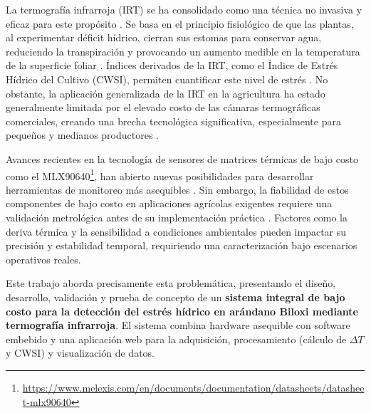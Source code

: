 \documentclass[12pt,openright,oneside]{book}
\begin{document}
La termografía infrarroja (IRT) se ha consolidado como una técnica no invasiva y eficaz para este propósito . Se basa en el principio fisiológico de que las plantas, al experimentar déficit hídrico, cierran sus estomas para conservar agua, reduciendo la transpiración y provocando un aumento medible en la temperatura de la superficie foliar . Índices derivados de la IRT, como el Índice de Estrés Hídrico del Cultivo (CWSI), permiten cuantificar este nivel de estrés . No obstante, la aplicación generalizada de la IRT en la agricultura ha estado generalmente limitada por el elevado costo de las cámaras termográficas comerciales, creando una brecha tecnológica significativa, especialmente para pequeños y medianos productores .

Avances recientes en la tecnología de sensores de matrices térmicas de bajo costo como el MLX90640\footnote{\url{https://www.melexis.com/en/documents/documentation/datasheets/datasheet-mlx90640}}, han abierto nuevas posibilidades para desarrollar herramientas de monitoreo más asequibles . Sin embargo, la fiabilidad de estos componentes de bajo costo en aplicaciones agrícolas exigentes requiere una validación metrológica antes de su implementación práctica . Factores como la deriva térmica y la sensibilidad a condiciones ambientales pueden impactar su precisión y estabilidad temporal, requiriendo una caracterización bajo escenarios operativos reales.

Este trabajo aborda precisamente esta problemática, presentando el diseño, desarrollo, validación y prueba de concepto de un \textbf{sistema integral de bajo costo para la detección del estrés hídrico en arándano Biloxi mediante termografía infrarroja}. El sistema combina hardware asequible con software embebido y una aplicación web para la adquisición, procesamiento (cálculo de $\Delta T$ y CWSI) y visualización de datos.
\end{document}
